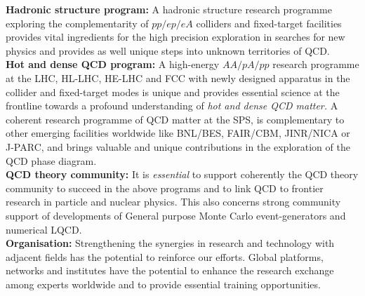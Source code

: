 \noindent \textbf{Hadronic structure program:}
A hadronic structure research programme exploring the complementarity of $pp/ep/eA$ colliders and fixed-target facilities provides vital ingredients for the high precision exploration in
searches for new physics and provides as well unique steps into unknown territories of QCD.
\\

\noindent\textbf{Hot and dense QCD program:} 
A high-energy $AA/pA/pp$ 
research programme  at the LHC, HL-LHC, HE-LHC and  FCC   
with newly designed  apparatus in the collider and fixed-target modes  is 
unique and provides essential
science at the frontline towards a profound understanding  of {\it hot and dense QCD matter.} 
A coherent  research programme of QCD matter at the SPS,
is complementary to other emerging facilities worldwide like BNL/BES, FAIR/CBM,  JINR/NICA  or J-PARC, and brings valuable and unique contributions in the exploration of the QCD phase diagram.   
\\

\noindent\textbf{QCD theory community:} It is
{\it essential} to support coherently the QCD theory community to succeed in the above programs and to link QCD
to
frontier research  in particle  and nuclear physics. This also 
 concerns  strong community  support of developments of General purpose Monte Carlo event-generators and numerical LQCD. 
\\ 

\noindent\textbf{Organisation:} Strengthening the synergies in research and technology with adjacent fields has the potential to reinforce our efforts. Global platforms, networks and institutes have the potential  to enhance the research exchange among experts worldwide and to provide essential training opportunities.



